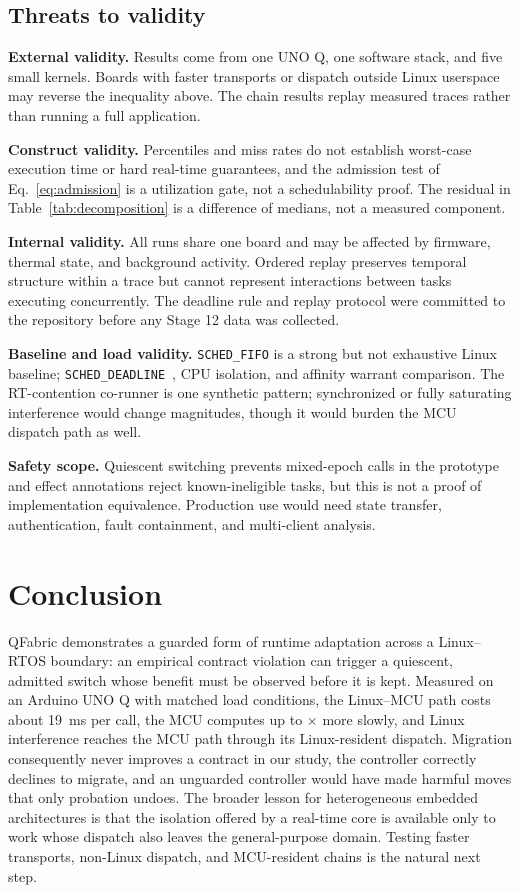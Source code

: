 \documentclass[conference]{IEEEtran}
\newcommand{\system}{QFabric\xspace}
\begin{document}
\subsection{Threats to validity}
\label{sec:threats}
\textbf{External validity.} Results come from one UNO Q, one software stack,
and five small kernels. Boards with faster transports or dispatch outside
Linux userspace may reverse the inequality above. The chain results replay
measured traces rather than running a full application.

\textbf{Construct validity.} Percentiles and miss rates do not establish
worst-case execution time or hard real-time guarantees, and the admission
test of Eq.~\eqref{eq:admission} is a utilization gate, not a schedulability
proof. The residual in Table~\ref{tab:decomposition} is a difference of
medians, not a measured component.

\textbf{Internal validity.} All runs share one board and may be affected by
firmware, thermal state, and background activity. Ordered replay preserves
temporal structure within a trace but cannot represent interactions between
tasks executing concurrently. The deadline rule and replay protocol were
committed to the repository before any Stage 12 data was collected.

\textbf{Baseline and load validity.} \texttt{SCHED\_FIFO} is a strong but not
exhaustive Linux baseline; \texttt{SCHED\_DEADLINE}~\cite{lelli2016deadline},
CPU isolation, and affinity warrant comparison. The RT-contention co-runner is
one synthetic pattern; synchronized or fully saturating interference would
change magnitudes, though it would burden the MCU dispatch path as well.

\textbf{Safety scope.} Quiescent switching prevents mixed-epoch calls in the
prototype and effect annotations reject known-ineligible tasks, but this is
not a proof of implementation equivalence. Production use would need state
transfer, authentication, fault containment, and multi-client analysis.

\FloatBarrier
\section{Conclusion}
\label{sec:conclusion}
\system demonstrates a guarded form of runtime adaptation across a
Linux--RTOS boundary: an empirical contract violation can trigger a
quiescent, admitted switch whose benefit must be observed before it is kept.
Measured on an Arduino UNO Q with matched load conditions, the Linux--MCU
path costs about 19~ms per call, the MCU computes up to
\StageTwelveFirComputeRatio$\times$ more slowly, and Linux interference
reaches the MCU path through its Linux-resident dispatch. Migration
consequently never improves a contract in our study, the controller correctly
declines to migrate, and an unguarded controller would have made harmful
moves that only probation undoes. The broader lesson for heterogeneous
embedded architectures is that the isolation offered by a real-time core is
available only to work whose dispatch also leaves the general-purpose
domain. Testing faster transports, non-Linux dispatch, and MCU-resident
chains is the natural next step.
\end{document}

